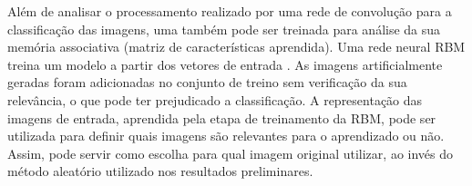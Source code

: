Além de analisar o processamento realizado por uma rede de convolução para a classificação das imagens, uma  também pode ser treinada para análise da sua memória associativa (matriz de características aprendida). Uma rede neural RBM treina um modelo a partir dos vetores de entrada \cite{Fischer2014}. As imagens artificialmente geradas foram adicionadas no conjunto de treino sem verificação da sua relevância, o que pode ter prejudicado a classificação. A representação das imagens de entrada, aprendida pela etapa de treinamento da RBM, pode ser utilizada para definir quais imagens são relevantes para o aprendizado ou não. Assim, pode servir como escolha para qual imagem original utilizar, ao invés do método aleatório utilizado nos resultados preliminares.
